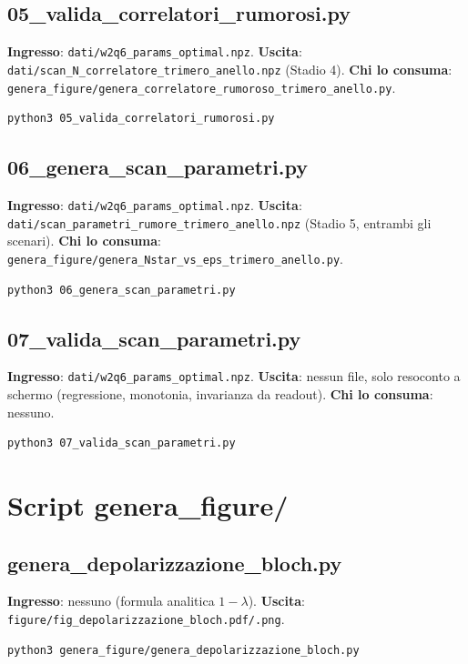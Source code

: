 \documentclass[11pt,a4paper]{article}
\begin{document}
\subsection{05\_valida\_correlatori\_rumorosi.py}
\textbf{Ingresso}: \texttt{dati/w2q6\_params\_optimal.npz}.
\textbf{Uscita}: \texttt{dati/scan\_N\_\allowbreak correlatore\_trimero\_anello.npz}
(Stadio 4). \textbf{Chi lo consuma}:
\texttt{genera\_figure/\allowbreak genera\_correlatore\_\allowbreak rumoroso\_trimero\_anello.py}.
\begin{verbatim}
python3 05_valida_correlatori_rumorosi.py
\end{verbatim}

\subsection{06\_genera\_scan\_parametri.py}
\textbf{Ingresso}: \texttt{dati/w2q6\_params\_optimal.npz}.
\textbf{Uscita}:
\texttt{dati/scan\_parametri\_\allowbreak rumore\_trimero\_anello.npz} (Stadio 5,
entrambi gli scenari). \textbf{Chi lo consuma}:
\texttt{genera\_figure/\allowbreak genera\_Nstar\_vs\_eps\_\allowbreak trimero\_anello.py}.
\begin{verbatim}
python3 06_genera_scan_parametri.py
\end{verbatim}

\subsection{07\_valida\_scan\_parametri.py}
\textbf{Ingresso}: \texttt{dati/w2q6\_params\_optimal.npz}.
\textbf{Uscita}: nessun file, solo resoconto a schermo (regressione,
monotonia, invarianza da readout). \textbf{Chi lo consuma}: nessuno.
\begin{verbatim}
python3 07_valida_scan_parametri.py
\end{verbatim}

\section{Script genera\_figure/}

\subsection{genera\_depolarizzazione\_bloch.py}
\textbf{Ingresso}: nessuno (formula analitica $1-\lambda$).
\textbf{Uscita}: \texttt{figure/fig\_\allowbreak depolarizzazione\_bloch.pdf/.png}.
\begin{verbatim}
python3 genera_figure/genera_depolarizzazione_bloch.py
\end{verbatim}
\end{document}
